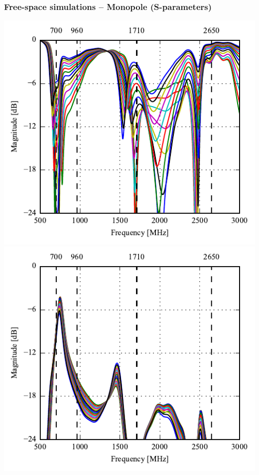 
\begin{frame}
    \frametitle{Free-space simulations -- Monopole (S-parameters)}
    \vspace*{-0.5cm}
  \begin{minipage}[t]{0.49\linewidth}
    \vspace{0mm}

    \includegraphics[width=0.78\linewidth]{img/henrik/mono/s11} \\
    \includegraphics[width=0.78\linewidth]{img/henrik/mono/s21-s11} 

  \end{minipage}\hfill       
  \begin{minipage}[t]{0.49\linewidth}
    \vspace{0 mm}


\end{minipage}
\end{frame}
